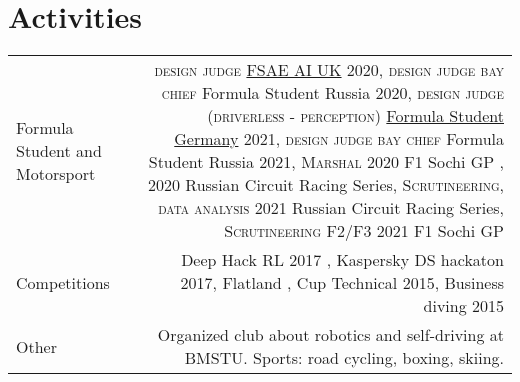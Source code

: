 \section*{\sectionformat Activities}
\begin{tabular}{@{}L!{\VRule}R}
    Formula Student and Motorsport &
    {\textsc{design judge}} \href{https://www.imeche.org/events/formula-student/team-information/fs-ai}{FSAE AI UK} 2020,
    {\textsc{design judge bay chief}} Formula Student Russia 2020,
    {\textsc{design judge (driverless - perception)}} \href{https://www.formulastudent.de/fsg/}{Formula Student Germany} 2021,
    {\textsc{design judge bay chief}} Formula Student Russia 2021,
    {\textsc{Marshal}} 2020 F1 Sochi GP , 2020 Russian Circuit Racing Series,
    {\textsc{Scrutineering, data analysis}} 2021 Russian Circuit Racing Series,
    {\textsc{Scrutineering F2/F3}} 2021 F1 Sochi GP
    \\
    Competitions                   &
    Deep Hack RL 2017 ,
    Kaspersky DS hackaton 2017,
    Flatland ,
    Cup Technical 2015,
    Business diving 2015
    \\
    Other                          &
    Organized club about robotics and self-driving at BMSTU.
    Sports: road cycling, boxing, skiing.
\end{tabular}
